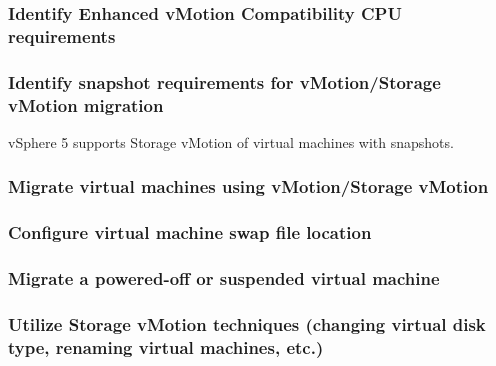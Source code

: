 \subsubsection{Identify Enhanced vMotion Compatibility CPU requirements}

\subsubsection{Identify snapshot requirements for vMotion/Storage vMotion migration}

vSphere 5 supports Storage vMotion of virtual machines with snapshots.

\subsubsection{Migrate virtual machines using vMotion/Storage vMotion}

\subsubsection{Configure virtual machine swap file location}

\subsubsection{Migrate a powered-off or suspended virtual machine}

\subsubsection{Utilize Storage vMotion techniques (changing virtual disk type, renaming virtual machines, etc.)}
